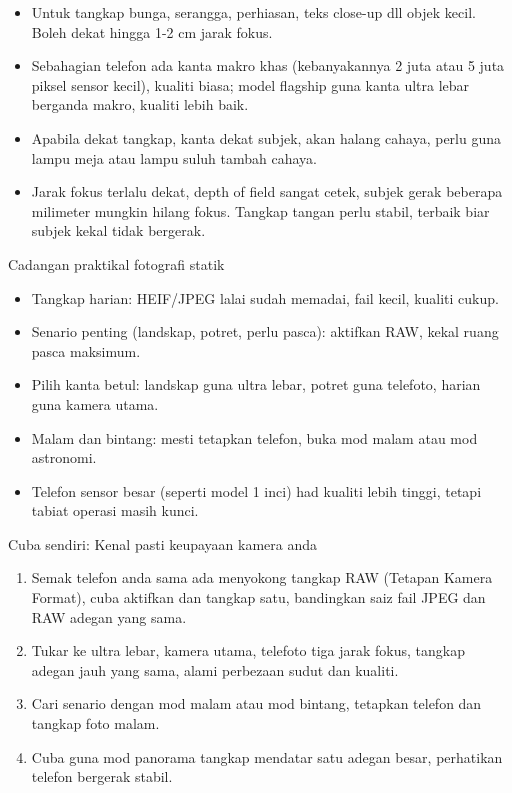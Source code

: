 \begin{itemize}
  \item Untuk tangkap bunga, serangga, perhiasan, teks close-up dll objek kecil. Boleh dekat hingga 1-2 cm jarak fokus.
  \item Sebahagian telefon ada kanta makro khas (kebanyakannya 2 juta atau 5 juta piksel sensor kecil), kualiti biasa; model flagship guna kanta ultra lebar berganda makro, kualiti lebih baik.
  \item Apabila dekat tangkap, kanta dekat subjek, akan halang cahaya, perlu guna lampu meja atau lampu suluh tambah cahaya.
  \item Jarak fokus terlalu dekat, depth of field sangat cetek, subjek gerak beberapa milimeter mungkin hilang fokus. Tangkap tangan perlu stabil, terbaik biar subjek kekal tidak bergerak.
\end{itemize}

\begin{tcbinfo}{Cadangan praktikal fotografi statik}
\begin{itemize}
  \item Tangkap harian: HEIF/JPEG lalai sudah memadai, fail kecil, kualiti cukup.
  \item Senario penting (landskap, potret, perlu pasca): aktifkan RAW, kekal ruang pasca maksimum.
  \item Pilih kanta betul: landskap guna ultra lebar, potret guna telefoto, harian guna kamera utama.
  \item Malam dan bintang: mesti tetapkan telefon, buka mod malam atau mod astronomi.
  \item Telefon sensor besar (seperti model 1 inci) had kualiti lebih tinggi, tetapi tabiat operasi masih kunci.
\end{itemize}

\end{tcbinfo}

\begin{tcbpractice}{Cuba sendiri: Kenal pasti keupayaan kamera anda}
\begin{enumerate}
  \item Semak telefon anda sama ada menyokong tangkap RAW (Tetapan Kamera Format), cuba aktifkan dan tangkap satu, bandingkan saiz fail JPEG dan RAW adegan yang sama.
  \item Tukar ke ultra lebar, kamera utama, telefoto tiga jarak fokus, tangkap adegan jauh yang sama, alami perbezaan sudut dan kualiti.
  \item Cari senario dengan mod malam atau mod bintang, tetapkan telefon dan tangkap foto malam.
  \item Cuba guna mod panorama tangkap mendatar satu adegan besar, perhatikan telefon bergerak stabil.
\end{enumerate}

\end{tcbpractice}
